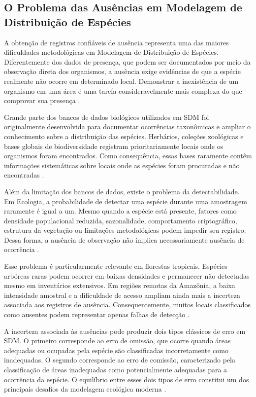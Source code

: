 \subsection{O Problema das Ausências em Modelagem de Distribuição de Espécies}

A obtenção de registros confiáveis de ausência representa uma das maiores dificuldades metodológicas em Modelagem de Distribuição de Espécies. Diferentemente dos dados de presença, que podem ser documentados por meio da observação direta dos organismos, a ausência exige evidências de que a espécie realmente não ocorre em determinado local. Demonstrar a inexistência de um organismo em uma área é uma tarefa consideravelmente mais complexa do que comprovar sua presença \citep{franklin2010mapping}.

Grande parte dos bancos de dados biológicos utilizados em SDM foi originalmente desenvolvida para documentar ocorrências taxonômicas e ampliar o conhecimento sobre a distribuição das espécies. Herbários, coleções zoológicas e bases globais de biodiversidade registram prioritariamente locais onde os organismos foram encontrados. Como consequência, essas bases raramente contêm informações sistemáticas sobre locais onde as espécies foram procuradas e não encontradas \citep{peterson2011ecological}.

Além da limitação dos bancos de dados, existe o problema da detectabilidade. Em Ecologia, a probabilidade de detectar uma espécie durante uma amostragem raramente é igual a um. Mesmo quando a espécie está presente, fatores como densidade populacional reduzida, sazonalidade, comportamento criptográfico, estrutura da vegetação ou limitações metodológicas podem impedir seu registro. Dessa forma, a ausência de observação não implica necessariamente ausência de ocorrência \citep{mackenzie2006occupancy}.

Esse problema é particularmente relevante em florestas tropicais. Espécies arbóreas raras podem ocorrer em baixas densidades e permanecer não detectadas mesmo em inventários extensivos. Em regiões remotas da Amazônia, a baixa intensidade amostral e a dificuldade de acesso ampliam ainda mais a incerteza associada aos registros de ausência. Consequentemente, muitos locais classificados como ausentes podem representar apenas falhas de detecção \citep{guisan2017habitat}.

A incerteza associada às ausências pode produzir dois tipos clássicos de erro em SDM. O primeiro corresponde ao erro de omissão, que ocorre quando áreas adequadas ou ocupadas pela espécie são classificadas incorretamente como inadequadas. O segundo corresponde ao erro de comissão, caracterizado pela classificação de áreas inadequadas como potencialmente adequadas para a ocorrência da espécie. O equilíbrio entre esses dois tipos de erro constitui um dos principais desafios da modelagem ecológica moderna \citep{fielding1997review}.

